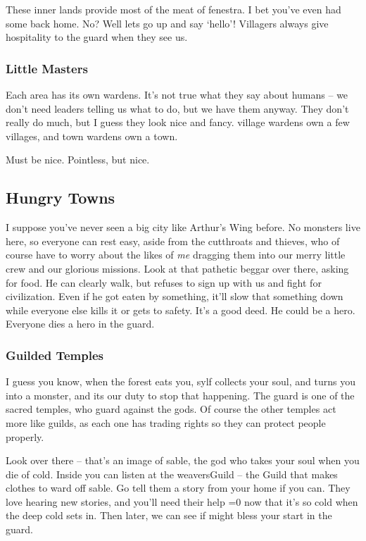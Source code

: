 \begin{multicols}{2}
\begin{exampletext}
  These inner lands provide most of the meat of \gls{fenestra}.
  I bet you've even had some back home.
  No?
  Well lets go up and say `hello'!
  Villagers always give hospitality to the \gls{guard} when they see us.

  \subsubsection*{Little Masters}

  Each area has its own \glspl{warden}.
  It's not true what they say about humans -- we don't need leaders telling us what to do, but we have them anyway.
  They don't really do much, but I guess they look nice and fancy.
  \Gls{village} \glspl{warden} own a few \glspl{village}, and town \glspl{warden} own a town.

  Must be nice.
  Pointless, but nice.

\subsection*{Hungry Towns}

  I suppose you've never seen a big city like Arthur's Wing before.
  No monsters live here, so everyone can rest easy, aside from the cutthroats and thieves, who of course have to worry about the likes of \emph{me} dragging them into our merry little crew and our glorious missions.
  Look at that pathetic beggar over there, asking for food.
  He can clearly walk, but refuses to sign up with us and fight for civilization.
  Even if he got eaten by something, it'll slow that something down while everyone else kills it or gets to safety.
  It's a good deed.
  He could be a hero.
  Everyone dies a hero in the \gls{guard}.

  \subsubsection*{Guilded Temples}

  I guess you know, when the forest eats you, \gls{sylf} collects your soul, and turns you into a monster, and its our duty to stop that happening.
  The \gls{guard} is one of the sacred temples, who guard against the gods.
  Of course the other temples act more like guilds, as each one has trading rights so they can protect people properly.

  Look over there -- that's an image of \gls{sable}, the god who takes your soul when you die of cold.
  Inside you can listen at the \gls{weaversGuild} -- the Guild that makes clothes to ward off \gls{sable}.
  Go tell them a story from your home if you can.
  They love hearing new stories, and you'll need their help \ifnum\value{temperature}=0 now that it's so cold \else when the deep cold sets in\fi.
  Then later, we can see if  might bless your start in the \gls{guard}.


\end{exampletext}
\end{multicols}
